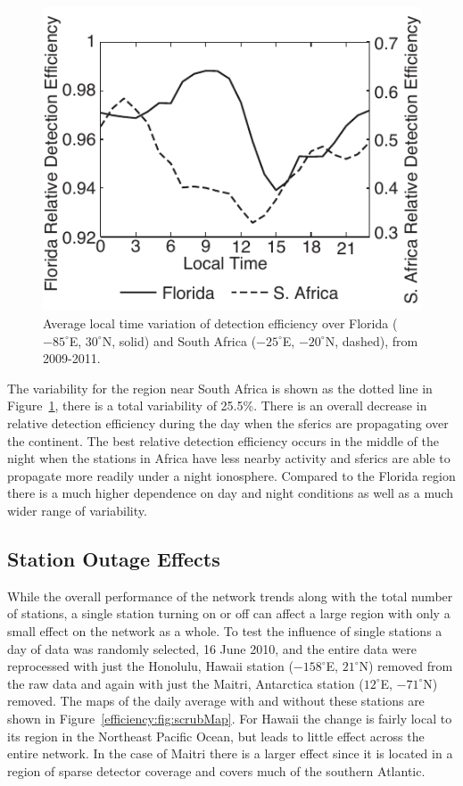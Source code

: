 \begin{figure}[ht!]
   \centering
\noindent\includegraphics[scale=1]{efficiency/Figures/2012RS005049-f11.pdf}
   \caption{Average local time variation of detection efficiency over Florida ($-85^\circ$E, $30^\circ$N, solid) and South Africa ($-25^\circ$E, $-20^\circ$N, dashed), from 2009-2011.}
   \label{efficiency:fig:deUTC}
\end{figure}

The variability for the region near South Africa is shown as the dotted line in Figure~\ref{efficiency:fig:deUTC}, there is a total variability of 25.5\%.
There is an overall decrease in relative detection efficiency during the day when the sferics are propagating over the continent.
The best relative detection efficiency occurs in the middle of the night when the stations in Africa have less nearby activity and sferics are able to propagate more readily under a night ionosphere.
Compared to the Florida region there is a much higher dependence on day and night conditions as well as a much wider range of variability.

\subsection{Station Outage Effects}

While the overall performance of the network trends along with the total number of stations, a single station turning on or off can affect a large region with only a small effect on the network as a whole.
To test the influence of single stations a day of data was randomly selected, 16 June 2010, and the entire data were reprocessed with just the Honolulu, Hawaii station ($-158^\circ$E, $21^\circ$N) removed from the raw data and again with just the Maitri, Antarctica station ($12^\circ$E, $-71^\circ$N) removed.
The maps of the daily average with and without these stations are shown in Figure~\ref{efficiency:fig:scrubMap}.
For Hawaii the change is fairly local to its region in the Northeast Pacific Ocean, but leads to little effect across the entire network.
In the case of Maitri there is a larger effect since it is located in a region of sparse detector coverage and covers much of the southern Atlantic.

